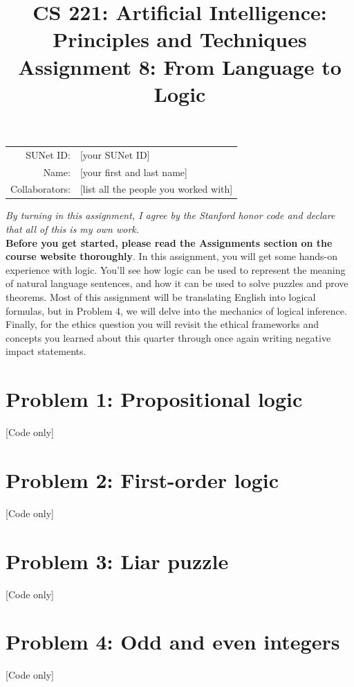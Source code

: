 \documentclass{article}
\title{\textbf{CS 221: Artificial Intelligence:\\ Principles and Techniques} \\Assignment 8: From Language to Logic}
\date{}
\theoremstyle{case}
\theoremstyle{definition}
\begin{document}
\newtheorem*{lemma}{Lemma}



\maketitle

\begin{center}
\begin{tabular}{rl}
SUNet ID: & [your SUNet ID] \\
Name: & [your first and last name] \\
Collaborators: & [list all the people you worked with]
\end{tabular}
\end{center}
\textit{By turning in this assignment, I agree by the Stanford honor code and declare
that all of this is my own work.} \\
\fontsize{12pt}{16pt}\selectfont
\textbf{Before you get started, please read the Assignments section on the course website thoroughly}.
\newline
\newline
In this assignment, you will get some hands-on experience with logic. You'll
see how logic can be used to represent the meaning of natural language
sentences, and how it can be used to solve puzzles and prove theorems. Most
of this assignment will be translating English into logical formulas, but in
Problem 4, we will delve into the mechanics of logical inference. Finally, for the ethics question you will revisit the ethical frameworks and concepts you learned about this quarter through once again writing negative impact statements. 
\newpage
\section*{Problem 1:  Propositional logic}
[Code only]
\section*{Problem 2: First-order logic}
[Code only]
\section*{Problem 3: Liar puzzle}
[Code only]
\section*{Problem 4: Odd and even integers}
[Code only]
\end{document}
